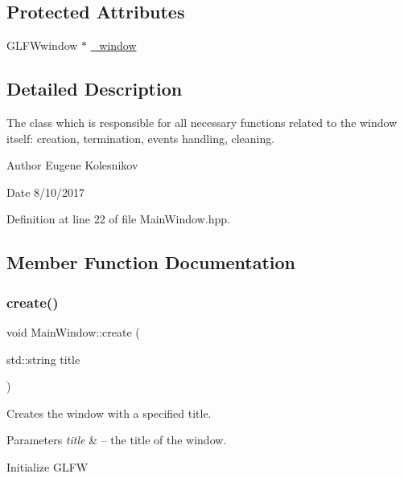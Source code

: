 \subsection*{Protected Attributes}
\begin{DoxyCompactItemize}
\item 
G\+L\+F\+Wwindow $\ast$ \hyperlink{class_main_window_a32bc8e4de92a68ff85f259b6420c372d}{\+\_\+window}
\end{DoxyCompactItemize}


\subsection{Detailed Description}
The class which is responsible for all necessary functions related to the window itself\+: creation, termination, events handling, cleaning. 

\begin{DoxyAuthor}{Author}
Eugene Kolesnikov 
\end{DoxyAuthor}
\begin{DoxyDate}{Date}
8/10/2017 
\end{DoxyDate}


Definition at line 22 of file Main\+Window.\+hpp.



\subsection{Member Function Documentation}
\mbox{\label{class_main_window_a215b729f3f6e8858173e45a0beed5715}} 
\subsubsection{\texorpdfstring{create()}{create()}}
{\footnotesize\ttfamily void Main\+Window\+::create (\begin{DoxyParamCaption}\item[{std\+::string}]{title }\end{DoxyParamCaption})}



Creates the window with a specified title. 


\begin{DoxyParams}{Parameters}
{\em title} & -- the title of the window. \\
\hline
\end{DoxyParams}
Initialize G\+L\+FW

